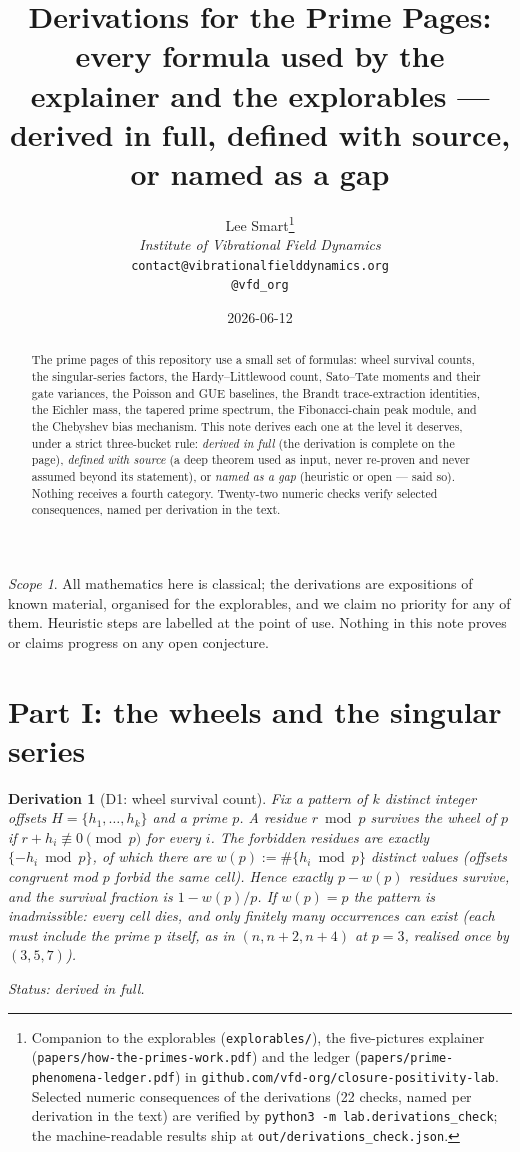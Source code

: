 \documentclass[11pt]{article}
\title{Derivations for the Prime Pages:\\
\large every formula used by the explainer and the explorables ---
derived in full, defined with source, or named as a gap}
\author{%
  Lee Smart\thanks{Companion to the explorables
(\texttt{explorables/}), the five-pictures explainer
(\texttt{papers/how-the-primes-work.pdf}) and the ledger
(\texttt{papers/prime-phenomena-ledger.pdf}) in
\texttt{github.com/vfd-org/closure-positivity-lab}. Selected numeric
consequences of the derivations (22 checks, named per derivation in
the text) are verified by
\texttt{python3 -m lab.derivations\_check}; the machine-readable
results ship at \texttt{out/derivations\_check.json}.}\\[4pt]
  \textit{Institute of Vibrational Field Dynamics}\\[2pt]
  \texttt{contact@vibrationalfielddynamics.org}\\[2pt]
  \texttt{@vfd\_org}%
}
\date{2026-06-12}
\newtheorem{deriv}{Derivation}
\theoremstyle{remark}
\newtheorem*{scope}{Scope}
\newcommand{\bucket}[1]{\par\smallskip\noindent\textit{Status: #1.}}
\begin{document}
\maketitle

\begin{abstract}\noindent
The prime pages of this repository use a small set of formulas: wheel
survival counts, the singular-series factors, the Hardy--Littlewood
count, Sato--Tate moments and their gate variances, the Poisson and GUE
baselines, the Brandt trace-extraction identities, the Eichler mass, the
tapered prime spectrum, the Fibonacci-chain peak module, and the
Chebyshev bias mechanism. This note derives each one at the level it
deserves, under a strict three-bucket rule: \emph{derived in full} (the
derivation is complete on the page), \emph{defined with source} (a deep
theorem used as input, never re-proven and never assumed beyond its
statement), or \emph{named as a gap} (heuristic or open --- said so).
Nothing receives a fourth category. Twenty-two numeric checks verify
selected consequences, named per derivation in the text.
\end{abstract}

\begin{scope}
All mathematics here is classical; the derivations are expositions of
known material, organised for the explorables, and we claim no priority
for any of them. Heuristic steps are labelled at the point of use.
Nothing in this note proves or claims progress on any open conjecture.
\end{scope}

\section{Part I: the wheels and the singular series}

\begin{deriv}[D1: wheel survival count]\label{d1}
Fix a pattern of $k$ distinct integer offsets
$H = \{h_1, \dots, h_k\}$ and a prime $p$. A residue $r \bmod p$
\emph{survives} the wheel of $p$ if $r + h_i \not\equiv 0 \pmod p$ for
every $i$. The forbidden residues are exactly
$\{-h_i \bmod p\}$, of which there are $w(p) := \#\{h_i \bmod p\}$
distinct values (offsets congruent mod $p$ forbid the same cell). Hence
exactly $p - w(p)$ residues survive, and the survival fraction is
$1 - w(p)/p$. If $w(p) = p$ the pattern is \emph{inadmissible}: every
cell dies, and only finitely many occurrences can exist (each must
include the prime $p$ itself, as in $(n, n{+}2, n{+}4)$ at $p = 3$,
realised once by $(3,5,7)$).
\bucket{derived in full}
\end{deriv}
\end{document}
